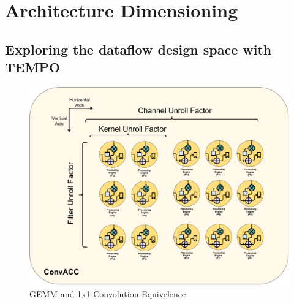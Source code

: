 \chapter{Architecture Dimensioning}
\label{chap:arch_dimensioning}

\section{Exploring the dataflow design space with TEMPO}
\label{chap:dataflow_dse:exploring}

\begin{figure}[]
    \centering
    \includegraphics[scale=0.4]{fig/axis_mapping.pdf}
    \caption{\ac{GEMM} and 1x1 Convolution Equivelence}
    \label{fig:axis_mapping}
\end{figure}

